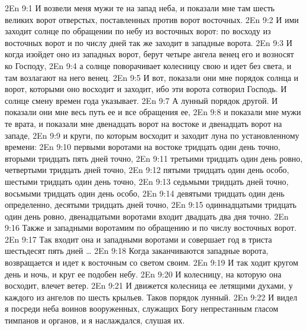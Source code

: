 \vs 2En 9:1
И возвели меня мужи те на запад неба, и показали мне там шесть великих ворот отверстых, поставленных против ворот восточных.
\vs 2En 9:2
И ими заходит солнце по обращении по небу из восточных ворот: по восходу из восточных ворот и по числу дней так же заходит в западные ворота.
\vs 2En 9:3
И когда изойдет оно из западных ворот, берут четыре ангела венец его и возносят ко Господу,
\vs 2En 9:4
а солнце поворачивает колесницу свою и идет без света, и там возлагают на него венец.
\vs 2En 9:5
И вот, показали они мне порядок солнца и ворот, которыми оно восходит и заходит, ибо эти ворота сотворил Господь. И солнце смену времен года указывает.
\vs 2En 9:7
А лунный порядок другой. И показали они мне весь путь ее и все обращения ее,
\vs 2En 9:8
и показали мне мужи те врата, и показали мне двенадцать ворот на востоке и двенадцать ворот на западе,
\vs 2En 9:9
и круги, по которым восходит и заходит луна по установленному времени:
\vs 2En 9:10
первыми воротами на востоке тридцать один день точно, вторыми тридцать пять дней точно,
\vs 2En 9:11
третьими тридцать один день ровно, четвертыми тридцать дней точно,
\vs 2En 9:12
пятыми тридцать один день особо, шестыми тридцать один день точно,
\vs 2En 9:13
седьмыми тридцать дней точно, восьмыми тридцать один день особо,
\vs 2En 9:14
девятыми тридцать один день определенно, десятыми тридцать дней точно,
\vs 2En 9:15
одиннадцатыми тридцать один день ровно, двенадцатыми воротами входит двадцать два дня точно.
\vs 2En 9:16
Также и западными воротамим по обращению и по числу восточных ворот.
\vs 2En 9:17
Так входит она и западными воротами и совершает год в триста шестьдесят пять дней \ldots
\vs 2En 9:18
Когда заканчиваются западные ворота, возвращается и идет к восточным со светом своим.
\vs 2En 9:19
И так ходит кругом день и ночь, и круг ее подобен небу.
\vs 2En 9:20
И колесницу, на которую она восходит, влечет ветер.
\vs 2En 9:21
И движется колесница ее летящими духами, у каждого из ангелов по шесть крыльев. Таков порядок лунный.
\vs 2En 9:22
И видел я посреди неба воинов вооруженных, служащих Богу непрестанным гласом тимпанов и органов, и я наслаждался, слушая их.

